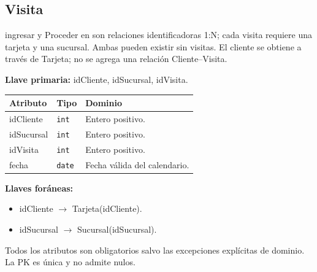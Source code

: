 \par\noindent\begin{minipage}{\textwidth}
\subsection{Visita}
ingresar y Proceder en son relaciones identificadoras 1:N; cada visita requiere una tarjeta y una sucursal. Ambas pueden existir sin visitas. El cliente se obtiene a través de Tarjeta; no se agrega una relación Cliente--Visita.\par
\textbf{Llave primaria:} idCliente, idSucursal, idVisita.\par
{\small\begin{tabular}{@{}p{}p{}p{}@{}}
\toprule Atributo & Tipo & Dominio \\ \midrule
idCliente & \texttt{int} & Entero positivo. \\
idSucursal & \texttt{int} & Entero positivo. \\
idVisita & \texttt{int} & Entero positivo. \\
fecha & \texttt{date} & Fecha válida del calendario. \\
\bottomrule\end{tabular}}
\textbf{Llaves foráneas:}\begin{itemize}[nosep]
\item idCliente $\rightarrow$ Tarjeta(idCliente).
\item idSucursal $\rightarrow$ Sucursal(idSucursal).
\end{itemize}
Todos los atributos son obligatorios salvo las excepciones explícitas de dominio. La PK es única y no admite nulos.
\end{minipage}\par\vspace{.35cm}
